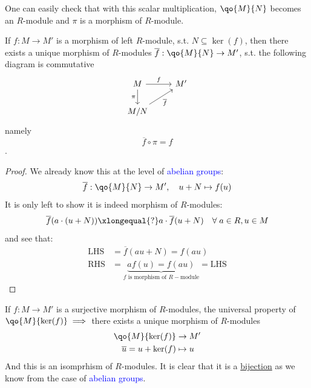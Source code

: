 One can easily check that with this scalar multiplication, \( \qo{M}{N} \) becomes an \( R \)-module
and \( \pi \) is a morphism of \( R \)-module.

\begin{proposition}
	If \( f: M \to M' \) is a morphism of left \( R \)-module, s.t. \( N \subseteq \ker(f) \), then
	there exists a unique morphism of \( R \)-modules \( \overline{f}: \qo{M}{N} \to M' \), s.t. the
	following diagram is commutative
	\[
		\begin{tikzcd}
			M \arrow[r, "f"] \arrow[d, "\pi"'] & M' \\
			M/N \arrow[ru, "\overline{f}"'] &
		\end{tikzcd}
	\]
	namely
	\[ \overline{f} \circ \pi = f \].
\end{proposition}

\begin{proof}
	We already know this at the level of \textcolor{blue}{abelian groups}:
	\[
		\overline{f} : \qo{M}{N} \to M', \quad u + N \mapsto f(u)
	\]
	It is only left to show it is indeed morphism of \( R \)-modules:
	\[
		\overline{f} (a\cdot (u+N)) \xlongequal{?} a \cdot \overline{f}(u+N) \quad \forall \; a\in R,
		u\in M
	\]
	and see that:
	\[
		\begin{aligned}
			\text{LHS} & = \overline{f} (au + N) = f(au)                                                        \\
			\text{RHS} & = \underbrace{af(u) = f(au)}_{f \text{ is morphism of } R- \text{module}} = \text{LHS}
		\end{aligned}
	\]
\end{proof}

\begin{theorem}
	If \( f: M \to M' \) is a surjective morphism of \( R \)-modules, the universal property of \(
	\qo{M}{\ker(f)} \implies \) there exists a unique morphism of \( R \)-modules
	\[
		\begin{aligned}
			\qo{M}{\ker(f)}          & \to M'    \\
			\overline{u}=u + \ker(f) & \mapsto u
		\end{aligned}
	\]
	And this is an isomprhism of \( R \)-modules. It is clear that it is a \underline{bijection} as we
	know from the case of \textcolor{blue}{abelian groups}.
\end{theorem}

